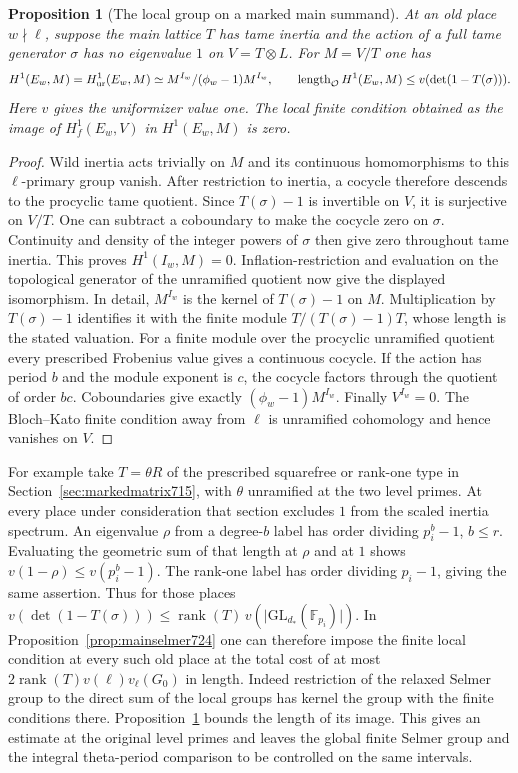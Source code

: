 \documentclass[a4paper,11pt]{article}
\newtheorem{proposition}{Proposition}[section]
\theoremstyle{definition}
\theoremstyle{remark}
\numberwithin{equation}{section}
\begin{document}
\begin{proposition}[The local group on a marked main summand]\leavevmode
\label{prop:maintamagawa725}
At an old place \(w\nmid\ell\), suppose the main lattice \(T\) has tame
inertia and the action of a full tame generator \(\sigma\) has no
eigenvalue \(1\) on \(V=T\otimes L\). For \(M=V/T\) one has
\[
 H^1(E_w,M)=H^1_{\rm ur}(E_w,M)
          \simeq M^{I_w}/(\phi_w-1)M^{I_w},
 \qquad
 \operatorname{length}_{\mathcal O}H^1(E_w,M)
                   \le v(\det(1-T(\sigma))).
\]
Here \(v\) gives the uniformizer value one. The local finite condition
obtained as the image of \(H^1_f(E_w,V)\) in \(H^1(E_w,M)\) is zero.
\end{proposition}
\begin{proof}
Wild inertia acts trivially on \(M\) and its continuous homomorphisms
to this \(\ell\)-primary group vanish. After restriction to inertia,
a cocycle therefore descends to the procyclic tame quotient. Since
\(T(\sigma)-1\) is invertible on \(V\), it is surjective on \(V/T\).
One can subtract a coboundary to make the cocycle zero on \(\sigma\).
Continuity and density of the integer powers of \(\sigma\) then give
zero throughout tame inertia. This proves \(H^1(I_w,M)=0\).
Inflation-restriction and evaluation on the topological generator
of the unramified quotient now give the displayed isomorphism.
In detail, \(M^{I_w}\) is the kernel of \(T(\sigma)-1\) on \(M\).
Multiplication by \(T(\sigma)-1\) identifies it with the finite module
\(T/(T(\sigma)-1)T\), whose length is the stated valuation.
For a finite module over the procyclic unramified quotient every
prescribed Frobenius value gives a continuous cocycle. If the action
has period \(b\) and the module exponent is \(c\), the cocycle factors
through the quotient of order \(bc\). Coboundaries give exactly
\((\phi_w-1)M^{I_w}\). Finally \(V^{I_w}=0\). The Bloch--Kato finite
condition away from \(\ell\) is unramified cohomology and hence vanishes
on \(V\).
\end{proof}

For example take \(T=\theta R\) of the prescribed squarefree or rank-one
type in Section~\ref{sec:markedmatrix715}, with \(\theta\) unramified at
the two level primes. At every place under consideration that section
excludes \(1\) from the scaled inertia spectrum. An eigenvalue \(\rho\)
from a degree-\(b\) label has order dividing \(p_i^b-1\), \(b\le r\).
Evaluating the geometric sum of that length at \(\rho\) and at \(1\)
shows \(v(1-\rho)\le v(p_i^b-1)\). The rank-one label has order
dividing \(p_i-1\), giving the same assertion. Thus for those places
\(v(\det(1-T(\sigma)))\le\operatorname{rank}(T)\,
v(\lvert\mathrm{GL}_{d_*}(\mathbb F_{p_i})\rvert)\). In
Proposition~\ref{prop:mainselmer724} one can therefore impose the
finite local condition at every such old place at the total cost of at
most \(2\operatorname{rank}(T)v(\ell)v_\ell(G_0)\) in length. Indeed
restriction of the relaxed Selmer group to the direct sum of the local
groups has kernel the group with the finite conditions there.
Proposition~\ref{prop:maintamagawa725} bounds the length of its image.
This gives an estimate at the original level primes and leaves the
global finite Selmer group and the integral theta-period comparison
to be controlled on the same intervals.
\clearpage
\end{document}
